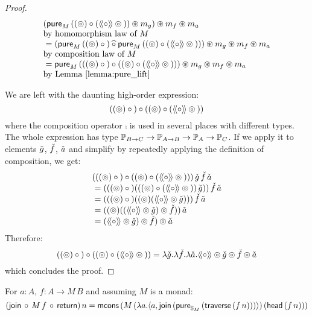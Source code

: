 \begin{proof}
$$\begin{array}{ll}
     (\mathsf{pure}_M\,((\circledcirc) \circ (\mathopen{\langle\!\langle}{\circ}\mathclose{\rangle\!\rangle} \circledcirc {}))
       \circledast m_g)
    \circledast m_f \circledast m_a\\
 \mbox{by homomorphism law of }M\\
{}= (\mathsf{pure}_M\,((\circledcirc) \circ {}) \mathbin{\widehat{\circ}}
     \mathsf{pure}_M\,((\circledcirc) \circ (\mathopen{\langle\!\langle}{\circ}\mathclose{\rangle\!\rangle} \circledcirc {})))
    \circledast m_g \circledast m_f \circledast m_a\\
\mbox{by composition law of }M\\
{}= \mathsf{pure}_M\,(((\circledcirc) \circ {}) \circ
                ((\circledcirc) \circ (\mathopen{\langle\!\langle}{\circ}\mathclose{\rangle\!\rangle} \circledcirc {})))
    \circledast m_g \circledast m_f \circledast m_a\\
\mbox{by Lemma \ref{lemma:pure_lift}}
\end{array}
$$

We are left with the daunting high-order expression:
$$
((\circledcirc) \circ {}) \circ ((\circledcirc) \circ (\mathopen{\langle\!\langle}{\circ}\mathclose{\rangle\!\rangle} \circledcirc {}))
$$
where the composition operator $\comp$ is used in several places with different types.
The whole expression has type $\mathbb{P}_{B\rightarrow C}\rightarrow \mathbb{P}_{A\rightarrow B} \rightarrow \mathbb{P}_{A}\rightarrow \mathbb{P}_{C}$.
If we apply it to elements $\check{g}$, $\check{f}$, $\check{a}$ and simplify by repeatedly applying the definition of composition, we get:
$$
\begin{array}{l}
(((\pappl) \comp {}) \comp ((\pappl) \comp (\ppair{\comp} \pappl {})))\,
\pstr{g}\,\pstr{f}\,\pstr{a}\\
{}= (((\pappl) \comp {}) (((\pappl) \comp (\ppair{\comp} \pappl {}))\,\pstr{g}))\,
    \pstr{f}\,\pstr{a}\\
{}= (((\pappl) \comp {}) ((\pappl) (\ppair{\comp} \pappl\pstr{g})))\,
    \pstr{f}\,\pstr{a}\\
{}= ((\pappl) ((\ppair{\comp} \pappl\pstr{g}) \pappl \pstr{f}))\,\pstr{a}\\
{}= (\ppair{\comp} \pappl\pstr{g}) \pappl \pstr{f})\pappl\pstr{a}\\
\end{array}
$$
Therefore:
$$
((\circledcirc) \circ {}) \circ ((\circledcirc) \circ (\mathopen{\langle\!\langle}{\circ}\mathclose{\rangle\!\rangle} \circledcirc {}))
= \lambda \check{g}. \lambda \check{f}. \lambda \check{a}.
  \mathopen{\langle\!\langle}{\circ}\mathclose{\rangle\!\rangle} \circledcirc\check{g} \circledcirc \check{f} \circledcirc\check{a}
$$
which concludes the proof.
\end{proof}


\begin{lemmaa}{17}
For $a : A$, $f : A \rightarrow M\, B$ and assuming $M$ is a monad:
$$
(\mathsf{join}\, \circ\,  M\, f\, \circ\, \mathsf{return})\, n = \mathsf{mcons}\, (M\,(\lambda a . \langle a, \mathsf{join}\, (\mathsf{pure}_{\mathbb{S}_{M}}\, (\mathsf{traverse}\, (f\, n))) \rangle)\, (\mathsf{head}\, (f\, n)))
$$
\end{lemmaa}

